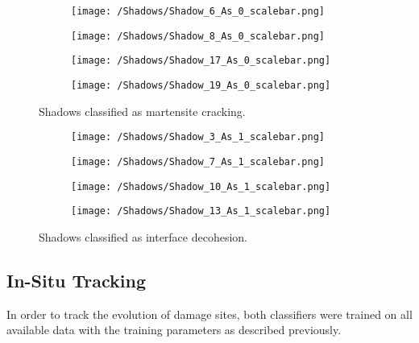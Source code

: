 \begin{figure}[H]
\centering
\begin{subfigure}{0.24\textwidth}
\texttt{[image: /Shadows/Shadow\_6\_As\_0\_scalebar.png]}
\caption{}
\end{subfigure}
\centering
\begin{subfigure}{0.24\textwidth}
\texttt{[image: /Shadows/Shadow\_8\_As\_0\_scalebar.png]}
\caption{}
\end{subfigure}
\centering
\begin{subfigure}{0.24\textwidth}
\texttt{[image: /Shadows/Shadow\_17\_As\_0\_scalebar.png]}
\caption{}
\end{subfigure}
\centering
\begin{subfigure}{0.24\textwidth}
\texttt{[image: /Shadows/Shadow\_19\_As\_0\_scalebar.png]}
\caption{}
\end{subfigure}
\caption{Shadows classified as martensite cracking.}
\label{fig:shadowAsMC}
\end{figure}

\begin{figure}[H]
\centering
\begin{subfigure}{0.24\textwidth}
\texttt{[image: /Shadows/Shadow\_3\_As\_1\_scalebar.png]}
\caption{}
\end{subfigure}
\centering
\begin{subfigure}{0.24\textwidth}
\texttt{[image: /Shadows/Shadow\_7\_As\_1\_scalebar.png]}
\caption{}
\end{subfigure}
\centering
\begin{subfigure}{0.24\textwidth}
\texttt{[image: /Shadows/Shadow\_10\_As\_1\_scalebar.png]}
\caption{}
\end{subfigure}
\centering
\begin{subfigure}{0.24\textwidth}
\texttt{[image: /Shadows/Shadow\_13\_As\_1\_scalebar.png]}
\caption{}
\end{subfigure}
\caption{Shadows classified as interface decohesion.}
\label{fig:shadowAsID}
\end{figure}


\subsection{In-Situ Tracking}
In order to track the evolution of damage sites, both classifiers were trained on all available data with the training parameters as described previously. \\

